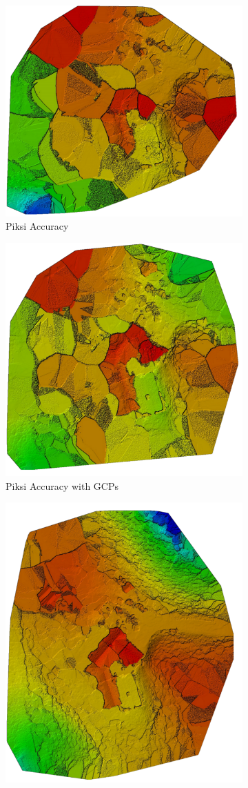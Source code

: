 \documentclass{article}
\begin{document}
\begin{figure}
\begin{subfigure}{.33\textwidth}
  \includegraphics[width=.72\linewidth]{images/DSM/p_accurate.png}
  \caption{Piksi Accuracy }
  \label{fig:sub2}
\end{subfigure}
\begin{subfigure}{.33\textwidth}
  \centering
  \includegraphics[width=.72\linewidth]{images/DSM/p_gcp_accurate.png}
  \caption{Piksi Accuracy with GCPs}
  \label{fig:sub1}
\end{subfigure}%
\begin{subfigure}{.33\textwidth}
  \centering
  \includegraphics[width=.72\linewidth]{images/DSM/ublox.png}

\end{subfigure}
\end{figure}
\end{document}
